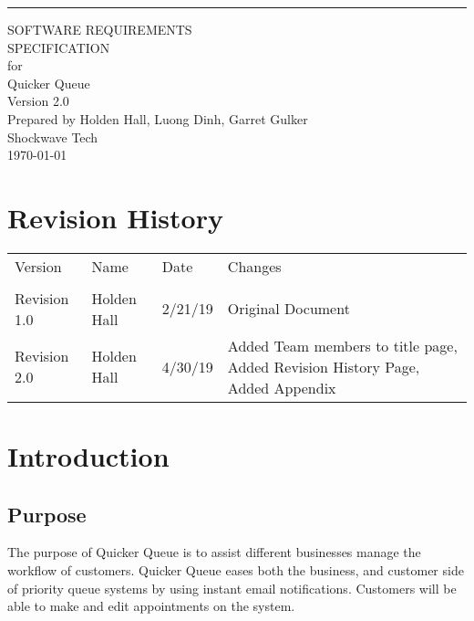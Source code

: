 \documentclass{scrreprt}
\date{}
\def\myversion{2.0 }
\begin{document}
\begin{flushright}
    \rule{16cm}{5pt}\vskip1cm
    \begin{bfseries}
        \Huge{SOFTWARE REQUIREMENTS\\ SPECIFICATION}\\
        \vspace{1.9cm}
        for\\
        \vspace{1.9cm}
        Quicker Queue\\
        \vspace{1.9cm}
        \LARGE{Version \myversion}\\
        \vspace{1.7cm}
        Prepared by Holden Hall, Luong Dinh, Garret Gulker\\
        \vspace{1.7cm}
        Shockwave Tech\\
        \vspace{1.7cm}
        \today\\
    \end{bfseries}
\end{flushright}

\tableofcontents

\chapter*{Revision History}
\begin{center}
    \begin{tabulary}{1.2\textwidth}{LLLL}
        Version & Name & Date & Changes\\                                             \\
      \hline
      Revision 1.0 & Holden Hall & 2/21/19 & Original Document\\
      \hline
      Revision 2.0 & Holden Hall & 4/30/19 & Added Team members to title page, Added Revision History Page, Added Appendix\\
      \hline
    \end{tabulary}  
  \end{center}

\chapter{Introduction}

\section{Purpose}
The purpose of Quicker Queue is to assist different businesses manage the workflow of customers.
Quicker Queue eases both the business, and customer side of priority queue systems by using instant email notifications. Customers will be able to make and edit appointments on the system.
\end{document}
